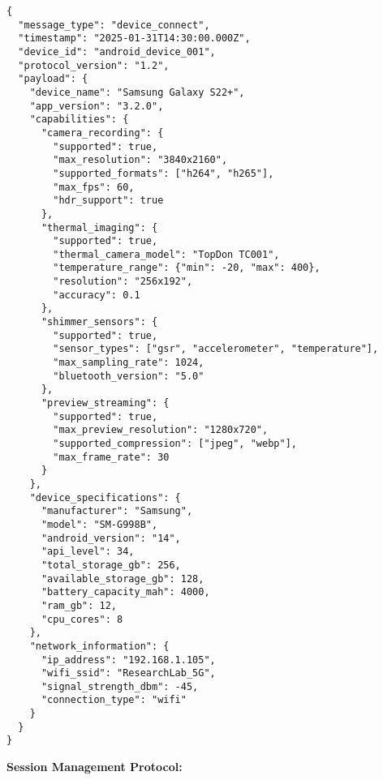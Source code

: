 \documentclass[11pt,a4paper]{article}
\begin{document}
\begin{verbatim}
{
  "message_type": "device_connect",
  "timestamp": "2025-01-31T14:30:00.000Z",
  "device_id": "android_device_001",
  "protocol_version": "1.2",
  "payload": {
    "device_name": "Samsung Galaxy S22+",
    "app_version": "3.2.0",
    "capabilities": {
      "camera_recording": {
        "supported": true,
        "max_resolution": "3840x2160",
        "supported_formats": ["h264", "h265"],
        "max_fps": 60,
        "hdr_support": true
      },
      "thermal_imaging": {
        "supported": true,
        "thermal_camera_model": "TopDon TC001",
        "temperature_range": {"min": -20, "max": 400},
        "resolution": "256x192",
        "accuracy": 0.1
      },
      "shimmer_sensors": {
        "supported": true,
        "sensor_types": ["gsr", "accelerometer", "temperature"],
        "max_sampling_rate": 1024,
        "bluetooth_version": "5.0"
      },
      "preview_streaming": {
        "supported": true,
        "max_preview_resolution": "1280x720",
        "supported_compression": ["jpeg", "webp"],
        "max_frame_rate": 30
      }
    },
    "device_specifications": {
      "manufacturer": "Samsung",
      "model": "SM-G998B",
      "android_version": "14",
      "api_level": 34,
      "total_storage_gb": 256,
      "available_storage_gb": 128,
      "battery_capacity_mah": 4000,
      "ram_gb": 12,
      "cpu_cores": 8
    },
    "network_information": {
      "ip_address": "192.168.1.105",
      "wifi_ssid": "ResearchLab_5G",
      "signal_strength_dbm": -45,
      "connection_type": "wifi"
    }
  }
}
\end{verbatim}

\textbf{Session Management Protocol:}
\end{document}
